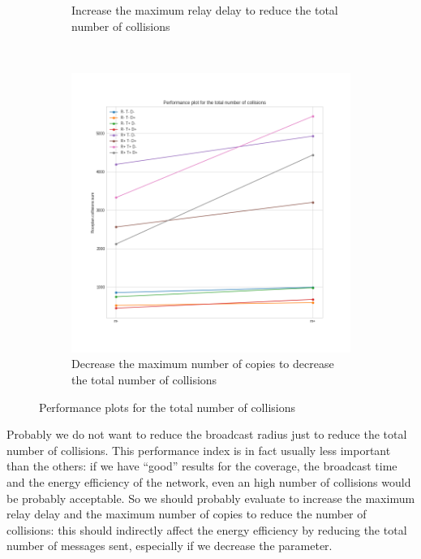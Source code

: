 \begin{figure}[htb]
\begin{subfigure}[b]{0.38\textwidth}
		\caption{Increase the maximum relay delay to reduce the total
		number of collisions}\label{subfig:hdperfcollisionsD}
	\end{subfigure}\\
	\begin{subfigure}[b]{0.37\textwidth}
		\centering
		\includegraphics[width=\textwidth]{img/hd/collisions-m-perfplot}
		\caption{Decrease the maximum number of copies to decrease the
		total number of collisions}\label{subfig:hdperfcollisionsm}
	\end{subfigure}
	\caption{Performance plots for the total number of
	collisions}\label{fig:hdperfcollisions}
\end{figure}

Probably we do not want to reduce the broadcast radius just to reduce the total
number of collisions. This performance index is in fact usually less important
than the others: if we have ``good'' results for the coverage, the broadcast
time and the energy efficiency of the network, even an high number of collisions
would be probably acceptable. So we should probably evaluate to increase the
maximum relay delay and the maximum number of copies to reduce the number of
collisions: this should indirectly affect the energy efficiency by reducing the
total number of messages sent, especially if we decrease the 
parameter.
